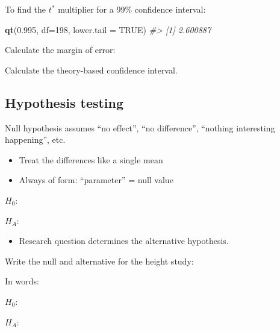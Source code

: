 \documentclass[
]{report}
\newenvironment{Shaded}{\begin{snugshade}}{\end{snugshade}}
\newcommand{\AttributeTok}[1]{\textcolor[rgb]{0.13,0.29,0.53}{#1}}
\newcommand{\CommentTok}[1]{\textcolor[rgb]{0.56,0.35,0.01}{\textit{#1}}}
\newcommand{\ConstantTok}[1]{\textcolor[rgb]{0.56,0.35,0.01}{#1}}
\newcommand{\DecValTok}[1]{\textcolor[rgb]{0.00,0.00,0.81}{#1}}
\newcommand{\FloatTok}[1]{\textcolor[rgb]{0.00,0.00,0.81}{#1}}
\newcommand{\FunctionTok}[1]{\textcolor[rgb]{0.13,0.29,0.53}{\textbf{#1}}}
\newcommand{\NormalTok}[1]{#1}
\providecommand{\tightlist}{%
  \setlength{\itemsep}{0pt}\setlength{\parskip}{0pt}}
\begin{document}
To find the \(t^*\) multiplier for a 99\% confidence interval:

\begin{Shaded}
\begin{Highlighting}[]
\FunctionTok{qt}\NormalTok{(}\FloatTok{0.995}\NormalTok{, }\AttributeTok{df=}\DecValTok{198}\NormalTok{, }\AttributeTok{lower.tail =} \ConstantTok{TRUE}\NormalTok{)}
\CommentTok{\#\textgreater{} [1] 2.600887}
\end{Highlighting}
\end{Shaded}

Calculate the margin of error:
\vspace{0.4in}

Calculate the theory-based confidence interval.
\vspace{0.5in}

\hypertarget{hypothesis-testing-3}{%
\subsection*{Hypothesis testing}\label{hypothesis-testing-3}}

Null hypothesis assumes ``no effect'', ``no difference'', ``nothing interesting happening'', etc.

\begin{itemize}
\item
  Treat the differences like a single mean
\item
  Always of form: ``parameter'' = null value
\end{itemize}

\(H_0:\)

\vspace{0.2in}

\(H_A:\)

\vspace{0.2in}

\begin{itemize}
\tightlist
\item
  Research question determines the alternative hypothesis.
\end{itemize}

Write the null and alternative for the height study:

In words:

\(H_0:\)

\vspace{0.5in}

\(H_A:\)

\vspace{0.5in}
\end{document}
